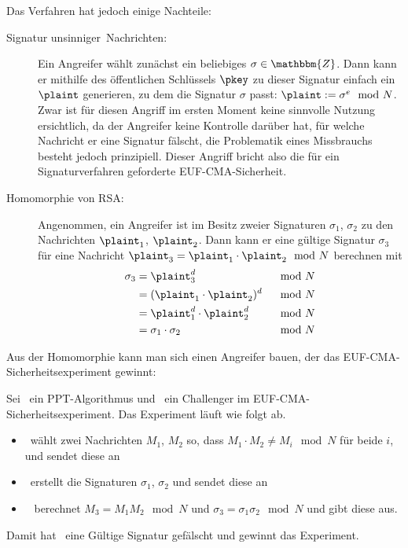 Das Verfahren hat jedoch einige Nachteile:
\begin{description}
    \item[Signatur \glqq unsinniger\grqq~Nachrichten:] Ein Angreifer
      wählt zunächst ein beliebiges $\sigma \in \mathbbm{Z}$. Dann kann
      er mithilfe des öffentlichen Schlüssels $\pkey$ zu dieser Signatur
      einfach ein $\plaint$ generieren, zu dem die Signatur $\sigma$
      passt: $\plaint := \sigma^e \mod N$.\\ 
    Zwar ist für diesen Angriff im ersten Moment keine sinnvolle Nutzung
    ersichtlich, da der Angreifer keine Kontrolle darüber hat, für
    welche Nachricht er eine Signatur fälscht, die Problematik eines
    Missbrauchs besteht jedoch prinzipiell. Dieser Angriff bricht also
    die für ein Signaturverfahren geforderte EUF-CMA-Sicherheit.
  \item[Homomorphie von RSA:] Angenommen, ein Angreifer ist im Besitz
    zweier Signaturen $\sigma_1$, $\sigma_2$ zu den Nachrichten
    $\plaint_1$, $\plaint_2$. Dann kann er eine gültige Signatur
    $\sigma_3$ für
    eine Nachricht $\plaint_3 = \plaint_1 \cdot \plaint_2 \mod N$
    berechnen mit
    \begin{alignat*}{2}
      \sigma_3 &= \plaint_3^d  & \mod N\\
               &=  (\plaint_1 \cdot \plaint_2)^d & \mod N \\
               &= \plaint_1^d \cdot \plaint_2^d &\mod N\\
               &= \sigma_1 \cdot \sigma_2 &\mod N
    \end{alignat*}
  \end{description}
  Aus der Homomorphie kann man sich einen Angreifer bauen, der das
  EUF-CMA-Sicherheits\-experiment gewinnt: 
  \begin{beispiel}
    Sei \A~ein PPT-Algorithmus und \C~ein Challenger im
    EUF-CMA-Sicherheits\-experiment. Das Experiment läuft wie folgt ab.
    \begin{itemize}
    \item \A~wählt zwei Nachrichten $M_1$, $M_2$ so, dass $ M_1\cdot M_2
      \neq M_i \mod N$ für beide $i$, und sendet diese an \C
    \item \C~erstellt die Signaturen $\sigma_1$, $\sigma_2$ und sendet
      diese an \A
    \item \A~ berechnet $M_3=M_1M_2 \mod N$ und
      $\sigma_3=\sigma_1\sigma_2 \mod N$ und gibt diese aus.
    \end{itemize}
    Damit hat \A~eine Gültige Signatur gefälscht und gewinnt das Experiment.
  \end{beispiel}
